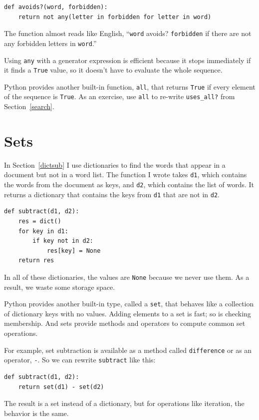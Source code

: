 \documentclass[10pt]{book}
\begin{document}
\begin{verbatim}
def avoids?(word, forbidden):
    return not any(letter in forbidden for letter in word)
\end{verbatim}
%
The function almost reads like English, ``{\tt word} avoids?
{\tt forbidden} if there are not any forbidden letters in {\tt word}.''

Using {\tt any} with a generator expression is efficient because
it stops immediately if it finds a {\tt True} value,
so it doesn't have to evaluate the whole sequence.

Python provides another built-in function, {\tt all}, that returns
{\tt True} if every element of the sequence is {\tt True}.  As
an exercise, use {\tt all} to re-write \verb"uses_all?" from
Section~\ref{search}.


\section{Sets}
\label{sets}

In Section~\ref{dictsub} I use dictionaries to find the words
that appear in a document but not in a word list.  The function
I wrote takes {\tt d1}, which contains the words from the document
as keys, and {\tt d2}, which contains the list of words.  It
returns a dictionary that contains the keys from {\tt d1} that
are not in {\tt d2}.

\begin{verbatim}
def subtract(d1, d2):
    res = dict()
    for key in d1:
        if key not in d2:
            res[key] = None
    return res
\end{verbatim}
%
In all of these dictionaries, the values are {\tt None} because
we never use them.  As a result, we waste some storage space.

Python provides another built-in type, called a {\tt set}, that
behaves like a collection of dictionary keys with no values.  Adding
elements to a set is fast; so is checking membership.  And sets
provide methods and operators to compute common set operations.

For example, set subtraction is available as a method called
{\tt difference} or as an operator, {\tt -}.  So we can rewrite
{\tt subtract} like this:

\begin{verbatim}
def subtract(d1, d2):
    return set(d1) - set(d2)
\end{verbatim}
%
The result is a set instead of a dictionary, but for operations like
iteration, the behavior is the same.
\end{document}
